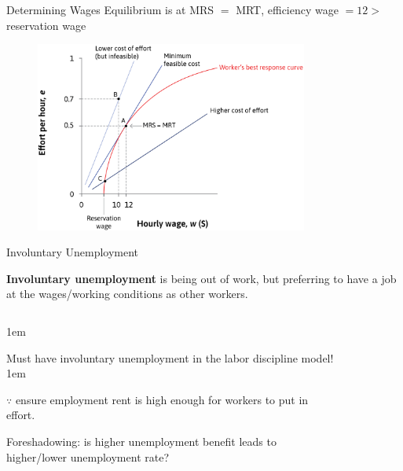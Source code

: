 \documentclass[11pt,aspectratio=43,usenames,dvipsnames]{beamer}
\let\olditemize=\itemize
\let\endolditemize=\enditemize
\renewenvironment{itemize}{\olditemize \itemsep1em}{\endolditemize}
\theoremstyle{definition}
\begin{document}
\begin{frame}{Determining Wages}
\label{slide:Determining_Wages}
    Equilibrium is at MRS $ = $ MRT, efficiency wage $ = 12 >$ reservation wage
    \begin{figure}
        \centering
        \includegraphics[width=0.8\textwidth]{./figures/EquilibriumLaborMkt.png}
    \end{figure}

\end{frame}

\begin{frame}{Involuntary Unemployment}
\label{slide:Involuntary_Unemployment}
    \begin{definition}
        \textbf{Involuntary unemployment} is being out of work, but preferring to have a job at the wages/working conditions as other workers.
    \end{definition}
    \begin{columns}
        \begin{column}{0.5\textwidth}
            \begin{itemize}
                \item Must have involuntary unemployment in the labor discipline model!
                \begin{itemize}
                    \item $ \because $ ensure employment rent is high enough for workers to put in effort.
                \end{itemize}
                \item Foreshadowing: is higher unemployment benefit leads to higher/lower unemployment rate?
            \end{itemize}
        \end{column}
        \begin{column}{0.5\textwidth}
            \begin{figure}
                \centering
                
            \end{figure}
        \end{column}
    \end{columns}
\end{frame}
\end{document}
